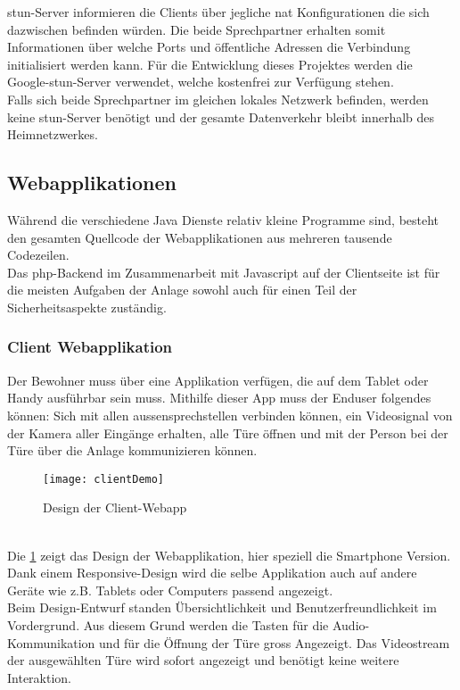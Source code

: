 \gls{stun}-Server informieren die Clients über jegliche \gls{nat} Konfigurationen die sich dazwischen befinden würden. Die beide Sprechpartner erhalten somit Informationen über welche Ports und öffentliche Adressen die Verbindung initialisiert werden kann. Für die Entwicklung dieses Projektes werden die Google-\gls{stun}-Server verwendet, welche kostenfrei zur Verfügung stehen.
\\
Falls sich beide Sprechpartner im gleichen lokales Netzwerk befinden, werden keine \gls{stun}-Server benötigt und der gesamte Datenverkehr bleibt innerhalb des Heimnetzwerkes.

\subsection{Webapplikationen}
\label{kap:webapp}
Während die verschiedene Java Dienste relativ kleine Programme sind, besteht den gesamten Quellcode der Webapplikationen aus mehreren tausende Codezeilen. 
\\
Das \gls{php}-Backend im Zusammenarbeit mit Javascript auf der Clientseite ist für die meisten Aufgaben der Anlage sowohl auch für einen Teil der Sicherheitsaspekte zuständig.

\subsubsection{Client Webapplikation}
Der Bewohner muss über eine Applikation verfügen, die auf dem Tablet oder Handy ausführbar sein muss. Mithilfe dieser App muss der Enduser folgendes können: Sich mit allen \gls{aussensprechstelle}n verbinden können, ein Videosignal von der Kamera aller Eingänge erhalten, alle Türe öffnen und mit der Person bei der Türe über die Anlage kommunizieren können.
\\
\begin{figure}[htb!]
	\begin{center}
		\texttt{[image: clientDemo]}
		\caption[Design der Client-Webapp]{Design der Client-Webapp}
		\label{fig:clientDemo}
	\end{center}
\end{figure}
\\
Die \cref{fig:clientDemo} zeigt das Design der Webapplikation, hier speziell die Smartphone Version. Dank einem Responsive-Design wird die selbe Applikation auch auf andere Geräte wie z.B. Tablets oder Computers passend angezeigt.
\\ 
Beim Design-Entwurf standen Übersichtlichkeit und Benutzerfreundlichkeit im Vordergrund. Aus diesem Grund werden die Tasten für die Audio-Kommunikation und für die Öffnung der Türe gross Angezeigt. Das Videostream der ausgewählten Türe wird sofort angezeigt und benötigt keine weitere Interaktion.

